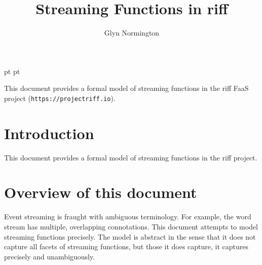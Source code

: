 \documentclass[a4paper,twoside,12pt]{article}
\begin{document}
 pt
 pt

\def\Slash{\slash\hspace{0pt}}

\title{Streaming Functions in riff}

\author{Glyn Normington}

\maketitle
\thispagestyle{empty}
\setcounter{page}{1}


This document provides a formal model of streaming functions in the riff FaaS project (\texttt{https://projectriff.io}).


\newcommand{\true}{true}
\newcommand{\false}{false}
\renewcommand{\emptyset}{\varnothing}

\clearpage
\tableofcontents

\cleardoublepage
{}
\setcounter{page}{1}

\section{Introduction}

This document provides a formal model of streaming functions in the riff project.

\section{Overview of this document}

Event streaming is fraught with ambiguous terminology. For example, the word stream has multiple, overlapping
connotations. This document attempts to model streaming functions precisely. The model is abstract in the sense
that it does not capture all facets of streaming functions, but those it does capture, it captures precisely and
unambiguously.
\end{document}
